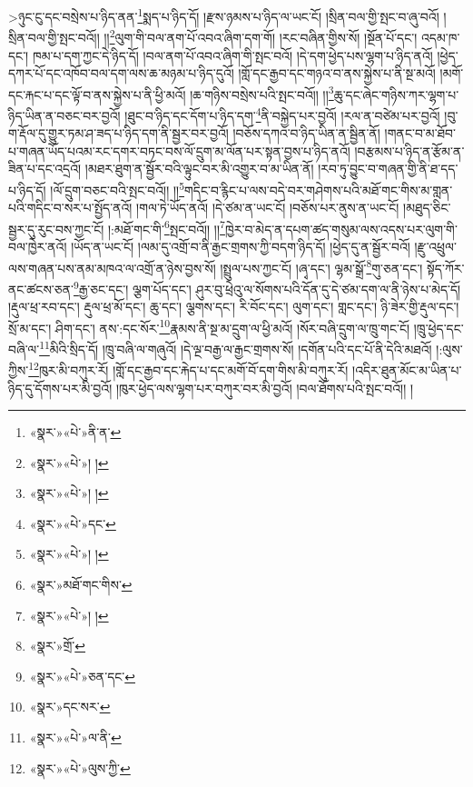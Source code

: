 >ཉུང་ངུ་དང་བསྲེས་པ་ཉིད་ནན་\footnote{«སྣར་»«པེ་»ནི་ན་}སྨད་པ་ཉིད་དོ། །རྫས་ཉམས་པ་ཉིད་ལ་ཡང་ངོ། །སྲིན་བལ་གྱི་སྤང་བ་ཞུ་བའོ། །སྲིན་བལ་གྱི་སྤང་བའོ།། །།\footnote{«སྣར་»«པེ་»། །}ལུག་གི་བལ་ནག་པོ་འབའ་ཞིག་དག་གོ། །རང་བཞིན་གྱིས་སོ། །སྔོན་པོ་དང་། འདམ་ཁ་དང་། ཁམ་པ་དག་ཀྱང་དེ་ཉིད་དོ། །བལ་ནག་པོ་འབའ་ཞིག་གི་སྤང་བའོ། །དེ་དག་ཕྱེད་པས་ལྷག་པ་ཉིད་ནའོ། །ཕྱེད་དཀར་པོ་དང་འཁོབ་བལ་དག་ལས་ཆ་མཉམ་པ་ཉིད་དུའོ། །གློ་དང་རྒྱབ་དང་གཉའ་བ་ནས་སྐྱེས་པ་ནི་སྔ་མའོ། །མགོ་དང་རྐང་པ་དང་ལྟོ་བ་ནས་སྐྱེས་པ་ནི་ཕྱི་མའོ། །ཆ་གཉིས་བསྲེས་པའི་སྤང་བའོ།། །།\footnote{«སྣར་»«པེ་»། །}ཆུ་དང་ཞེང་གཉིས་ཀར་ལྷག་པ་ཉིད་ཡིན་ན་བཅང་བར་བྱའོ། །ཐུང་བ་ཉིད་དང་དོག་པ་ཉིད་དག་\footnote{«སྣར་»«པེ་»དང་}ནི་བསྐྱེད་པར་བྱའོ། །རལ་ན་བཙེམ་པར་བྱའོ། །བུ་ག་རྡོལ་དུ་གྱུར་ཏམ་ཤ་ཟད་པ་ཉིད་དག་ནི་སྦྱར་བར་བྱའོ། །བཅོས་དཀའ་བ་ཉིད་ཡིན་ན་སྦྱིན་ནོ། །གནང་བ་མ་ཐོབ་པ་གཞན་ཡོད་པའམ་རང་དགར་བཏང་བས་ལོ་དྲུག་མ་ལོན་པར་སྟན་བྱས་པ་ཉིད་ནའོ། །བརྩམས་པ་ཉིད་ན་རྩོམ་ན་ཟིན་པ་དང་འདྲའོ། །མཐར་ཐུག་ན་སྦྱོར་བའི་ལྟུང་བར་མི་འགྱུར་བ་མ་ཡིན་ནོ། །རབ་ཏུ་བྱུང་བ་གཞན་གྱི་ནི་ཐ་དད་པ་ཉིད་དོ། །ལོ་དྲུག་བཅང་བའི་སྤང་བའོ།། །།\footnote{«སྣར་»«པེ་»། །}གདིང་བ་རྙིང་པ་ལས་བདེ་བར་གཤེགས་པའི་མཐོ་གང་གིས་མ་གླན་པའི་གདིང་བ་སར་པ་སྤྱོད་ནའོ། །གལ་ཏེ་ཡོད་ནའོ། །དེ་ཙམ་ན་ཡང་ངོ། །བཅོས་པར་ནུས་ན་ཡང་ངོ། །མཐུད་ཅིང་སྦྱར་དུ་རུང་བས་ཀྱང་ངོ། །:མཐོ་གང་གི་\footnote{«སྣར་»མཐོ་གང་གིས་}སྤང་བའོ།། །།\footnote{«སྣར་»«པེ་»། །}ཁྱེར་བ་མེད་ན་དཔག་ཚད་གསུམ་ལས་འདས་པར་ལུག་གི་བལ་ཁྱེར་ནའོ། །ཡོད་ན་ཡང་ངོ། །ལམ་དུ་འགྲོ་བ་ནི་རྒྱང་གྲགས་ཀྱི་བདག་ཉིད་དོ། །ཕྱེད་དུ་ན་སྦྱོར་བའོ། །རྫུ་འཕྲུལ་ལས་གཞན་པས་ནམ་མཁའ་ལ་འགྲོ་ན་ཉེས་བྱས་སོ། །སྤྲུལ་པས་ཀྱང་ངོ། །ཞྭ་དང་། ལྷམ་སྒྲོ་\footnote{«སྣར་»གྲོ་}གུ་ཅན་དང་། སྟོད་ཀོར་ནང་ཚངས་ཅན་\footnote{«སྣར་»«པེ་»ཅན་དང་}རྒྱ་ཅང་དང་། ལྕག་པོད་དང་། ཤུར་བུ་ཕྲེའུ་ལ་སོགས་པའི་དོན་དུ་དེ་ཙམ་དག་ལ་ནི་ཉེས་པ་མེད་དོ། །རྡུལ་ཕྲ་རབ་དང་། རྡུལ་ཕྲ་མོ་དང་། ཆུ་དང་། ལྕགས་དང་། རི་བོང་དང་། ལུག་དང་། གླང་དང་། ཉི་ཟེར་གྱི་རྡུལ་དང་། སྲོ་མ་དང་། ཤིག་དང་། ནས་:དང་སོར་\footnote{«སྣར་»དང་སར་}རྣམས་ནི་སྔ་མ་དྲུག་ལ་ཕྱི་མའོ། །སོར་བཞི་དྲུག་ལ་ཁྲུ་གང་ངོ། །ཁྲུ་ཕྱེད་དང་བཞི་ལ་\footnote{«སྣར་»«པེ་»ལ་ནི་}མིའི་སྲིད་དོ། །ཁྲུ་བཞི་ལ་གཞུའོ། །དེ་ལྔ་བརྒྱ་ལ་རྒྱང་གྲགས་སོ། །དགོན་པའི་དང་པོ་ནི་དེའི་མཐའོ། །:ལུས་ཀྱིས་\footnote{«སྣར་»«པེ་»ལུས་ཀྱི་}ཁུར་མི་བཀུར་རོ། །གློ་དང་རྒྱབ་དང་རྐེད་པ་དང་མགོ་བོ་དག་གིས་མི་བཀུར་རོ། །འདིར་ཐུན་མོང་མ་ཡིན་པ་ཉིད་དུ་དོགས་པར་མི་བྱའོ། །ཁུར་ཕྱེད་ལས་ལྷག་པར་བཀུར་བར་མི་བྱའོ། །བལ་ཐོགས་པའི་སྤང་བའོ།། །
